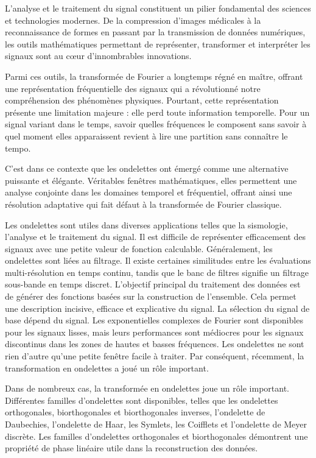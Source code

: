 L'analyse et le traitement du signal constituent un pilier fondamental des sciences et technologies modernes. De la compression d'images médicales à la reconnaissance de formes en passant par la transmission de données numériques, les outils mathématiques permettant de représenter, transformer et interpréter les signaux sont au cœur d'innombrables innovations.

Parmi ces outils, la transformée de Fourier a longtemps régné en maître, offrant une représentation fréquentielle des signaux qui a révolutionné notre compréhension des phénomènes physiques. Pourtant, cette représentation présente une limitation majeure : elle perd toute information temporelle. Pour un signal variant dans le temps, savoir quelles fréquences le composent sans savoir à quel moment elles apparaissent revient à lire une partition sans connaître le tempo.

C'est dans ce contexte que les ondelettes ont émergé comme une alternative puissante et élégante. Véritables fenêtres mathématiques, elles permettent une analyse conjointe dans les domaines temporel et fréquentiel, offrant ainsi une résolution adaptative qui fait défaut à la transformée de Fourier classique.

Les ondelettes sont utiles dans diverses applications telles que la sismologie, l'analyse et le traitement du signal. Il est difficile de représenter efficacement des signaux avec une petite valeur de fonction calculable. Généralement, les ondelettes sont liées au filtrage. Il existe certaines similitudes entre les évaluations multi-résolution en temps continu, tandis que le banc de filtres signifie un filtrage sous-bande en temps discret. L'objectif principal du traitement des données est de générer des fonctions basées sur la construction de l'ensemble. Cela permet une description incisive, efficace et explicative du signal. La sélection du signal de base dépend du signal. Les exponentielles complexes de Fourier sont disponibles pour les signaux lisses, mais leurs performances sont médiocres pour les signaux discontinus dans les zones de hautes et basses fréquences. Les ondelettes ne sont rien d'autre qu'une petite fenêtre facile à traiter. Par conséquent, récemment, la transformation en ondelettes a joué un rôle important.

Dans de nombreux cas, la transformée en ondelettes joue un rôle important. Différentes familles d'ondelettes sont disponibles, telles que les ondelettes orthogonales, biorthogonales et biorthogonales inverses, l'ondelette de Daubechies, l'ondelette de Haar, les Symlets, les Coifflets et l'ondelette de Meyer discrète. Les familles d'ondelettes orthogonales et biorthogonales démontrent une propriété de phase linéaire utile dans la reconstruction des données.


